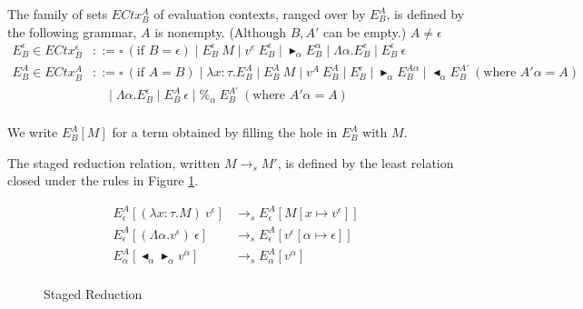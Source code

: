 \documentclass[runningheads]{llncs}
\newcommand{\TB}{\blacktriangleright}
\newcommand{\TBL}{\blacktriangleleft}
\begin{document}
\begin{definition}
	The family of sets $ECtx^A_B$ of evaluation contexts, ranged over by $E^A_B$, is defined by the following grammar,
	$A$ is nonempty. (Although $B,A'$ can be empty.)
	$A \neq \epsilon$\\
	\begin{align*}
		E^\epsilon_B \in ECtx^\epsilon_B & ::= \square\ (\text{if\ } B = \epsilon) \mid E^\epsilon_B\ M \mid v^e\ E^\epsilon_B
		\mid \TB_\alpha E^\alpha_B \mid \Lambda\alpha.E^\epsilon_B
		\mid E^\epsilon_B\ \epsilon                                                                                                \\
		E^A_B \in ECtx^A_B               & ::= \square\ (\text{if } A = B) \mid \lambda x:\tau.E^A_B \mid E^A_B\ M \mid v^A\ E^A_B
		\mid E^\epsilon_B \mid \TB_\alpha E^{A\alpha}_B
		\mid \TBL_\alpha E^{A'}_B \ (\text{where } A'\alpha = A)                                                                   \\
		                                 & \quad \mid \Lambda\alpha.E^\epsilon_B
		\mid E^A_B\ \epsilon \mid \%_\alpha\ E^{A'}_B \ (\text{where } A'\alpha = A)                                               \\
	\end{align*}
\end{definition}

We write $E^A_B[M]$ for a term obtained by filling the hole in $E^A_B$ with $M$.

\begin{definition}
	The staged reduction relation, written $M \longrightarrow_s M'$, is defined by 
	the least relation closed under the rules in Figure \ref{fig:staged-reduction}.
\end{definition}

\begin{figure}
	\begin{center}
		\begin{align*}
			E^A_\epsilon [(\lambda x:\tau.M)\ v^\epsilon]       & \longrightarrow_s E^A_\epsilon[M[x\mapsto v^\epsilon]]             \\
			E^A_\epsilon [(\Lambda\alpha.v^\epsilon)\ \epsilon] & \longrightarrow_s E^A_\epsilon[v^\epsilon[\alpha\mapsto \epsilon]] \\
			E^A_\alpha [\TBL_\alpha \TB_\alpha v^\alpha]        & \longrightarrow_s E^A_\alpha[v^\alpha]                             \\
		\end{align*}
		\caption{Staged Reduction}
		\label{fig:staged-reduction}
	\end{center}
\end{figure}
\end{document}
